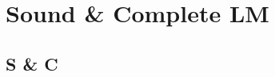 \section{Sound \& Complete LM}
  \subsection*{S \& C}
\begin{frame}
  \begin{block}{}
    
  \end{block}

\end{frame}
